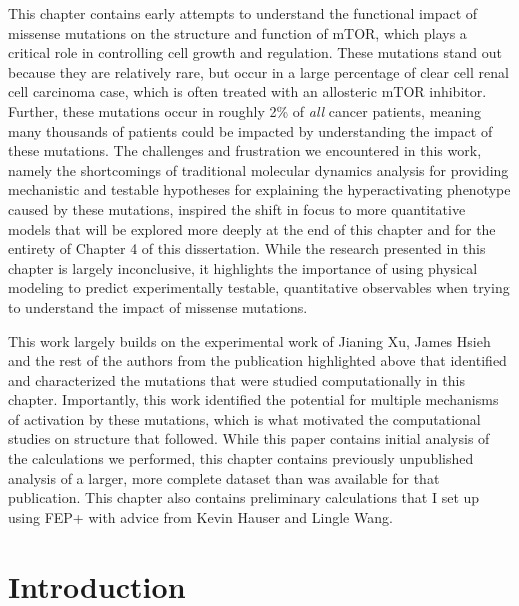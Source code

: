 \documentclass[phd,tocprelim]{cornell}
\begin{document}
This chapter contains early attempts to understand the functional impact of missense mutations on the structure and function of mTOR, which plays a critical role in controlling cell growth and regulation. These mutations stand out because they are relatively rare, but occur in a large percentage of clear cell renal cell carcinoma case, which is often treated with an allosteric mTOR inhibitor. Further, these mutations occur in roughly 2\% of \emph{all} cancer patients, meaning many thousands of patients could be impacted by understanding the impact of these mutations. The challenges and frustration we encountered in this work, namely the shortcomings of traditional molecular dynamics analysis for providing mechanistic and testable hypotheses for explaining the hyperactivating phenotype caused by these mutations, inspired the shift in focus to more quantitative models that will be explored more deeply at the end of this chapter and for the entirety of Chapter 4 of this dissertation. While the research presented in this chapter is largely inconclusive, it highlights the importance of using physical modeling to predict experimentally testable, quantitative observables when trying to understand the impact of missense mutations. 

This work largely builds on the experimental work of Jianing Xu, James Hsieh and the rest of the authors from the publication highlighted above that identified and characterized the mutations that were studied computationally in this chapter. Importantly, this work identified the potential for multiple mechanisms of activation by these mutations, which is what motivated the computational studies on structure that followed. While this paper contains initial analysis of the calculations we performed, this chapter contains previously unpublished analysis of a larger, more complete dataset than was available for that publication. This chapter also contains preliminary calculations that I set up using FEP+ with advice from Kevin Hauser and Lingle Wang. 

\section{Introduction}
\end{document}
